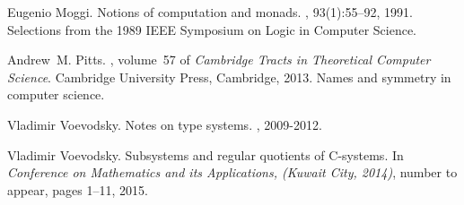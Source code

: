 \documentclass[11pt]{article}
\begin{document}
\begin{thebibliography}{10}
Eugenio Moggi.
\newblock Notions of computation and monads.
, 93(1):55--92, 1991.
\newblock Selections from the 1989 IEEE Symposium on Logic in Computer Science.

Andrew~M. Pitts.
, volume~57 of {\em Cambridge Tracts in Theoretical
  Computer Science}.
\newblock Cambridge University Press, Cambridge, 2013.
\newblock Names and symmetry in computer science.

Vladimir Voevodsky.
\newblock Notes on type systems.
,
  2009-2012.

Vladimir Voevodsky.
\newblock Subsystems and regular quotients of {C-systems}.
\newblock In {\em Conference on Mathematics and its Applications, (Kuwait City,
  2014)}, number to appear, pages 1--11, 2015.

\end{thebibliography}






%
%
\end{document}
